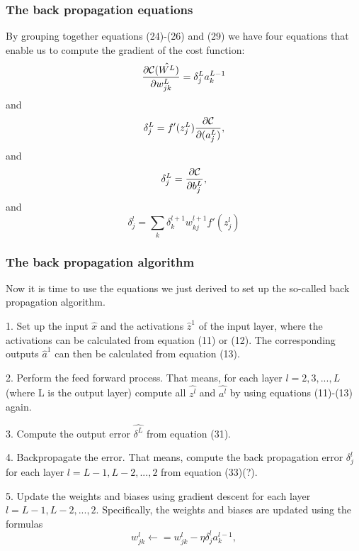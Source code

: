 \documentclass[a4paper,12pt]{article}
\begin{document}
\subsubsection{The back propagation equations}
By grouping together equations (24)-(26) and (29) we have four equations that enable us to compute the gradient of the cost function:
\begin{equation}
    \frac{\partial{\cal C}(\hat{W^L})}{\partial w_{jk}^L}  =  \delta_j^La_k^{L-1}
\end{equation}
and
\begin{equation}
\delta_j^L = f'(z_j^L)\frac{\partial {\cal C}}{\partial (a_j^L)},
\end{equation}
and
\begin{equation}
\delta_j^L = \frac{\partial {\cal C}}{\partial b_j^L},
\end{equation}
and
\begin{equation}
    \delta_j^l =\sum_k \delta_k^{l+1}w_{kj}^{l+1}f'(z_j^l)
\end{equation}

\subsubsection{The back propagation algorithm}
Now it is time to use the equations we just derived to set up the so-called back propagation algorithm.\newline

1. Set up the input $\hat{x}$ and the activations $\hat{z}^1$ of the input layer, where the activations can be calculated from equation (11) or (12). The corresponding outputs $\hat{a}^1$ can then be calculated from equation (13).\newline 

2. Perform the feed forward process. That means, for each layer $l = 2, 3,..., L$ (where L is the output layer) compute all $\hat{z^l}$ and $\hat{a^l}$ by using equations (11)-(13) again.\newline

3. Compute the output error $\hat{\delta^L}$ from equation (31).\newline

4. Backpropagate the error. That means, compute the back propagation error $\delta_j^l$ for each layer $l = L-1, L-2,..., 2$ from equation (33)(?).\newline

5. Update the weights and biases using gradient descent for each layer $l=L-1, L-2,..., 2$. Specifically, the weights and biases are updated using the formulas
\begin{equation}
    w_{jk}^l\leftarrow  = w_{jk}^l- \eta \delta_j^la_k^{l-1},
\end{equation}
\end{document}
